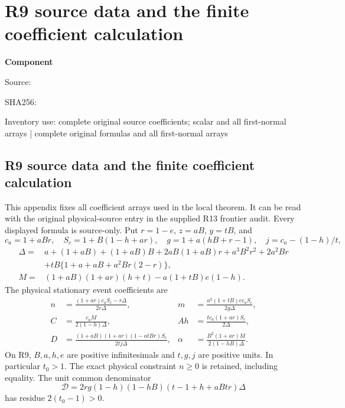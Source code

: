 \chapter{R9 source data and the finite coefficient calculation}
\label{component:pd709027c7805}
\noindent\textbf{Component }\par
{\small\noindent Source: \par}
{\small\noindent SHA256: \par}
{\small\noindent Inventory use: complete original source coefficients; scalar and all first-normal arrays | complete original formulas and all first-normal arrays\par}
\medskip
\section{R9 source data and the finite coefficient calculation}
This appendix fixes all coefficient arrays used in the local theorem.
It can be read with the original physical-source entry in the supplied
R13 frontier audit. Every displayed formula is source-only.
Put $r=1-e$, $z=aB$, $y=tB$, and
\[
 c_a=1+aBr,\quad S_c=1+B(1-h+ar),\quad
 g=1+a(hB+r-1),\quad j=c_a-(1-h)/t,
\]
\begin{align*}
\Delta={}&a+(1+aB)+(1+aB)B+2aB(1+aB)r+a^3B^2r^2+2a^2Br\\
 &+tB\{1+a+aB+a^2Br(2-r)\},\\
M={}&(1+aB)(1+ar)(h+t)-a(1+tB)e(1-h).
\end{align*}
The physical stationary event coefficients are
\[
\begin{aligned}
n&=\frac{(1+ar)c_aS_c-r\Delta}{2r\Delta},&
m&=\frac{a^2(1+tB)e c_aS_c}{2g\Delta},\\
C&=\frac{c_aM}{2(1-h)\Delta},&
Ah&=\frac{t c_a(1+ar)S_c}{2\Delta},\\
D&=\frac{(1+aB)(1+ar)(1-atBr)S_c}{2tj\Delta},&
\alpha&=\frac{B^2(1+ar)M}{2(1-hB)\Delta}.
\end{aligned}
\]
On R9, $B,a,h,e$ are positive infinitesimals and $t,g,j$ are
positive units. In particular $t_0>1$. The exact physical constraint
$n\ge0$ is retained, including equality. The unit common denominator
\[
\mathcal D=2rg(1-h)(1-hB)(t-1+h+aBtr)\Delta
\]
has residue $2(t_0-1)>0$.

